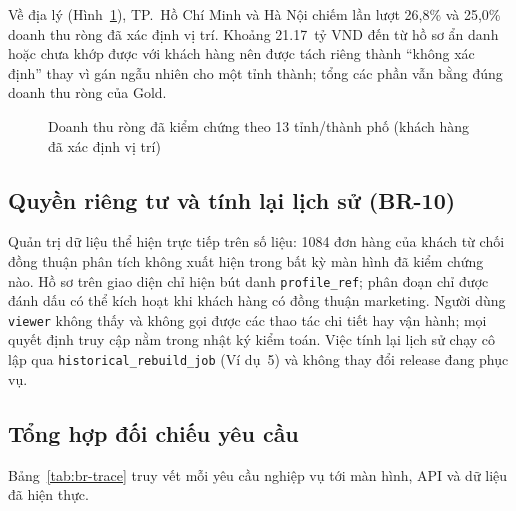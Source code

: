 Về địa lý (Hình~\ref{fig:geography}), TP.~Hồ Chí Minh và Hà Nội chiếm lần lượt 26,8\% và 25,0\% doanh thu ròng đã xác định vị trí. Khoảng \num{21,17}~tỷ VND đến từ hồ sơ ẩn danh hoặc chưa khớp được với khách hàng nên được tách riêng thành ``không xác định'' thay vì gán ngẫu nhiên cho một tỉnh thành; tổng các phần vẫn bằng đúng doanh thu ròng của Gold.

\begin{figure}[H]
\centering
{}
\caption{Doanh thu ròng đã kiểm chứng theo 13 tỉnh/thành phố (khách hàng đã xác định vị trí)}
\label{fig:geography}
\end{figure}

\subsection{Quyền riêng tư và tính lại lịch sử (BR-10)}
\label{sec:c4-br10}
Quản trị dữ liệu thể hiện trực tiếp trên số liệu: \num{1084} đơn hàng của khách từ chối đồng thuận phân tích không xuất hiện trong bất kỳ màn hình đã kiểm chứng nào. Hồ sơ trên giao diện chỉ hiện bút danh \texttt{profile\_ref}; phân đoạn chỉ được đánh dấu có thể kích hoạt khi khách hàng có đồng thuận marketing. Người dùng \texttt{viewer} không thấy và không gọi được các thao tác chi tiết hay vận hành; mọi quyết định truy cập nằm trong nhật ký kiểm toán. Việc tính lại lịch sử chạy cô lập qua \texttt{historical\_rebuild\_job} (Ví dụ~5) và không thay đổi release đang phục vụ.

\subsection{Tổng hợp đối chiếu yêu cầu}
\label{sec:c4-doi-chieu}
Bảng~\ref{tab:br-trace} truy vết mỗi yêu cầu nghiệp vụ tới màn hình, API và dữ liệu đã hiện thực.

